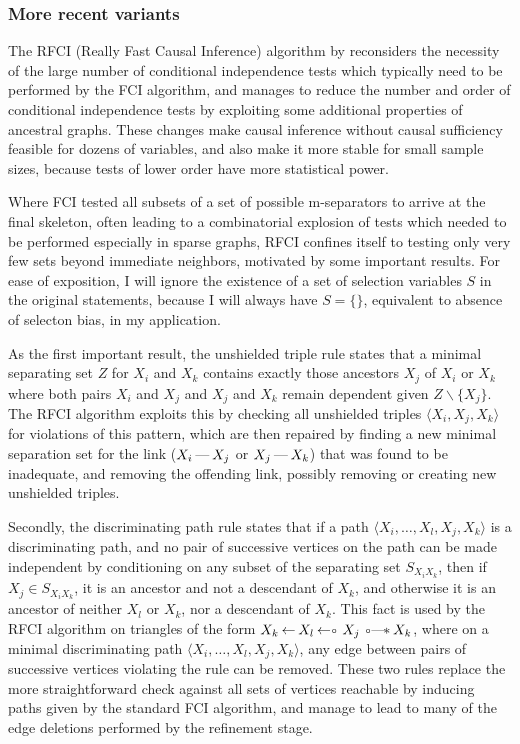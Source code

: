 \subsubsection{More recent variants}
The RFCI (Really Fast Causal Inference) algorithm by \cite{colombo_ea_2012} reconsiders the necessity of the large number of conditional independence tests which typically need to be performed by the FCI algorithm, and manages to reduce the number and order of conditional independence tests by exploiting some additional properties of ancestral graphs. These changes make causal inference without causal sufficiency feasible for dozens of variables, and also make it more stable for small sample sizes, because tests of lower order have more statistical power.

Where FCI tested all subsets of a set of possible m-separators to arrive at the final skeleton, often leading to a combinatorial explosion of tests which needed to be performed especially in sparse graphs, RFCI confines itself to testing only very few sets beyond immediate neighbors, motivated by some important results. For ease of exposition, I will ignore the existence of a set of selection variables $S$ in the original statements, because I will always have $S = \{\}$, equivalent to absence of selecton bias, in my application.

As the first important result, the unshielded triple rule states that a minimal separating set $Z$ for $X_i$ and $X_k$ contains exactly those ancestors $X_j$ of $X_i$ or $X_k$ where both pairs $X_i$ and $X_j$ and $X_j$ and $X_k$ remain dependent given $Z\backslash\{X_j\}$. The RFCI algorithm exploits this by checking all unshielded triples $\langle X_i, X_j, X_k \rangle$ for violations of this pattern, which are then repaired by finding a new minimal separation set for the link ($X_i \arrowLL X_j$ or $X_j \arrowLL X_k$) that was found to be inadequate, and removing the offending link, possibly removing or creating new unshielded triples.

Secondly, the discriminating path rule states that if a path $\langle X_i, \dots, X_l, X_j, X_k \rangle$ is a discriminating path, and no pair of successive vertices on the path can be made independent by conditioning on any subset of the separating set $S_{X_iX_k}$, then if $X_j \in S_{X_iX_k}$, it is an ancestor and not a descendant of $X_k$, and otherwise it is an ancestor of neither $X_l$ or $X_k$, nor a descendant of $X_k$. This fact is used by the RFCI algorithm on triangles of the form $X_k \arrowAL X_l \arrowAS X_j \arrowOS X_k$, where on a minimal discriminating path $\langle X_i, \dots, X_l, X_j, X_k \rangle$, any edge between pairs of successive vertices violating the rule can be removed. These two rules replace the more straightforward check against all sets of vertices reachable by inducing paths given by the standard FCI algorithm, and manage to lead to many of the edge deletions performed by the refinement stage.

